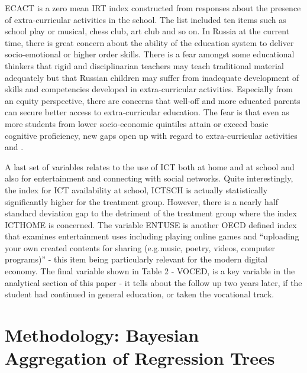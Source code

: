 \documentclass[alpha-refs,fleqn]{wiley-article_p2}
\begin{document}
ECACT is a zero mean IRT index constructed from responses about the presence of extra-curricular activities in the school. The list included ten items such as school play or musical, chess club, art club and so on.  In Russia at the current time, there is great concern about the ability of the education system to deliver socio-emotional or higher order skills. There is a fear amongst some educational thinkers that rigid and disciplinarian teachers may teach traditional material adequately but that Russian children may suffer from inadequate development of skills and competencies developed in extra-curricular activities. Especially from an equity perspective, there are concerns that well-off and more educated parents can secure better access to extra-curricular education. The fear is that even as more students from lower socio-economic quintiles attain or exceed basic cognitive proficiency, new gaps open up with regard to extra-curricular activities \cite{Snellman_2015} and \cite{Kosaretsky_2016}. 

A last set of variables relates to the use of ICT both at home and at school and also for entertainment and connecting with social networks. Quite interestingly, the index for ICT availability at school, ICTSCH is actually statistically significantly higher for the treatment group. However, there is a nearly half standard deviation gap to the detriment of the treatment group where the index ICTHOME is concerned. The variable ENTUSE is another OECD defined index that examines entertainment uses including playing online games and ``uploading your own created contents for sharing (e.g.music, poetry, videos, computer programs)'' - this item being particularly relevant for the modern digital economy. The final variable shown in Table 2 - VOCED, is a key variable in the analytical section of this paper - it tells about the follow up two years later, if the student had continued in general education, or taken the vocational track.

\section{Methodology: Bayesian Aggregation of Regression Trees} 
\end{document}
